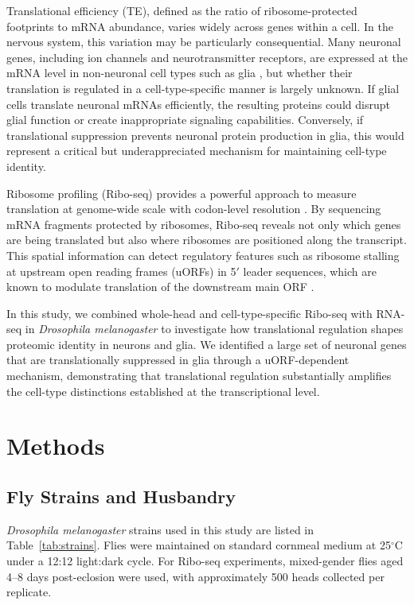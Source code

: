 \documentclass[12pt]{article}
\begin{document}
Translational efficiency (TE), defined as the ratio of ribosome-protected footprints to mRNA abundance, varies widely across genes within a cell. In the nervous system, this variation may be particularly consequential. Many neuronal genes, including ion channels and neurotransmitter receptors, are expressed at the mRNA level in non-neuronal cell types such as glia \citep{freeman2015drosophila, stork2014analysis}, but whether their translation is regulated in a cell-type-specific manner is largely unknown. If glial cells translate neuronal mRNAs efficiently, the resulting proteins could disrupt glial function or create inappropriate signaling capabilities. Conversely, if translational suppression prevents neuronal protein production in glia, this would represent a critical but underappreciated mechanism for maintaining cell-type identity.

Ribosome profiling (Ribo-seq) provides a powerful approach to measure translation at genome-wide scale with codon-level resolution \citep{ingolia2009genome, ingolia2019ribosome}. By sequencing mRNA fragments protected by ribosomes, Ribo-seq reveals not only which genes are being translated but also where ribosomes are positioned along the transcript. This spatial information can detect regulatory features such as ribosome stalling at upstream open reading frames (uORFs) in 5$'$ leader sequences, which are known to modulate translation of the downstream main ORF \citep{hinnebusch2016translational, johnstone2016upstream}.

In this study, we combined whole-head and cell-type-specific Ribo-seq with RNA-seq in \textit{Drosophila melanogaster} to investigate how translational regulation shapes proteomic identity in neurons and glia. We identified a large set of neuronal genes that are translationally suppressed in glia through a uORF-dependent mechanism, demonstrating that translational regulation substantially amplifies the cell-type distinctions established at the transcriptional level.

\section{Methods}

\subsection{Fly Strains and Husbandry}

\textit{Drosophila melanogaster} strains used in this study are listed in Table~\ref{tab:strains}. Flies were maintained on standard cornmeal medium at 25$^{\circ}$C under a 12:12 light:dark cycle. For Ribo-seq experiments, mixed-gender flies aged 4--8 days post-eclosion were used, with approximately 500 heads collected per replicate.
\end{document}
